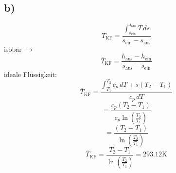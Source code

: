 

\subsection*{b)}
\[
\overline{T}_{\text{KF}} = \frac{\int_{s_{\text{ein}}}^{s_{\text{aus}}} T \, ds}{s_{\text{ein}} - s_{\text{aus}}}
\]
isobar $\rightarrow$
\[
\overline{T}_{\text{KF}} = \frac{h_{\text{aus}} - h_{\text{ein}}}{s_{\text{aus}} - s_{\text{ein}}}
\]
ideale Flüssigkeit:
\[
\overline{T}_{\text{KF}} = \frac{\int_{T_1}^{T_2} c_p \, dT + s(T_2 - T_1)}{c_p \, dT}
\]
\[
= \frac{c_p (T_2 - T_1)}{c_p \ln \left( \frac{T_2}{T_1} \right)}
\]
\[
= \frac{(T_2 - T_1)}{\ln \left( \frac{T_2}{T_1} \right)}
\]
\[
\overline{T}_{\text{KF}} = \frac{T_2 - T_1}{\ln \left( \frac{T_2}{T_1} \right)} = 293.12 \text{K}
\]